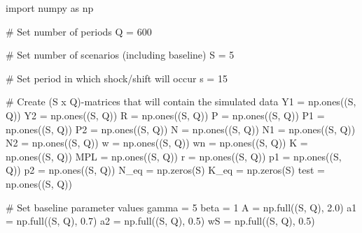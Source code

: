 \documentclass[
  letterpaper,
  DIV=11,
  numbers=noendperiod]{scrreprt}
\newenvironment{Shaded}{\begin{snugshade}}{\end{snugshade}}
\newcommand{\CommentTok}[1]{\textcolor[rgb]{0.37,0.37,0.37}{#1}}
\newcommand{\DecValTok}[1]{\textcolor[rgb]{0.68,0.00,0.00}{#1}}
\newcommand{\FloatTok}[1]{\textcolor[rgb]{0.68,0.00,0.00}{#1}}
\newcommand{\ImportTok}[1]{\textcolor[rgb]{0.00,0.46,0.62}{#1}}
\newcommand{\NormalTok}[1]{\textcolor[rgb]{0.00,0.23,0.31}{#1}}
\newcommand{\OperatorTok}[1]{\textcolor[rgb]{0.37,0.37,0.37}{#1}}
\begin{document}
\begin{tcolorbox}[enhanced jigsaw, titlerule=0mm, breakable, bottomrule=.15mm, toprule=.15mm, colbacktitle=quarto-callout-note-color!10!white, rightrule=.15mm, toptitle=1mm, opacityback=0, left=2mm, coltitle=black, title=\textcolor{quarto-callout-note-color}{\faInfo}\hspace{0.5em}{Python code}, colframe=quarto-callout-note-color-frame, opacitybacktitle=0.6, leftrule=.75mm, bottomtitle=1mm, arc=.35mm, colback=white]

\begin{Shaded}
\begin{Highlighting}[]
\ImportTok{import}\NormalTok{ numpy }\ImportTok{as}\NormalTok{ np}

\CommentTok{\# Set number of periods}
\NormalTok{Q }\OperatorTok{=} \DecValTok{600}

\CommentTok{\# Set number of scenarios (including baseline)}
\NormalTok{S }\OperatorTok{=} \DecValTok{5}

\CommentTok{\# Set period in which shock/shift will occur}
\NormalTok{s }\OperatorTok{=} \DecValTok{15}

\CommentTok{\# Create (S x Q){-}matrices that will contain the simulated data}
\NormalTok{Y1 }\OperatorTok{=}\NormalTok{ np.ones((S, Q))}
\NormalTok{Y2 }\OperatorTok{=}\NormalTok{ np.ones((S, Q))}
\NormalTok{R }\OperatorTok{=}\NormalTok{ np.ones((S, Q))}
\NormalTok{P }\OperatorTok{=}\NormalTok{ np.ones((S, Q))}
\NormalTok{P1 }\OperatorTok{=}\NormalTok{ np.ones((S, Q))}
\NormalTok{P2 }\OperatorTok{=}\NormalTok{ np.ones((S, Q))}
\NormalTok{N }\OperatorTok{=}\NormalTok{ np.ones((S, Q))}
\NormalTok{N1 }\OperatorTok{=}\NormalTok{ np.ones((S, Q))}
\NormalTok{N2 }\OperatorTok{=}\NormalTok{ np.ones((S, Q))}
\NormalTok{w }\OperatorTok{=}\NormalTok{ np.ones((S, Q))}
\NormalTok{wn }\OperatorTok{=}\NormalTok{ np.ones((S, Q))}
\NormalTok{K }\OperatorTok{=}\NormalTok{ np.ones((S, Q))}
\NormalTok{MPL }\OperatorTok{=}\NormalTok{ np.ones((S, Q))}
\NormalTok{r }\OperatorTok{=}\NormalTok{ np.ones((S, Q))}
\NormalTok{p1 }\OperatorTok{=}\NormalTok{ np.ones((S, Q))}
\NormalTok{p2 }\OperatorTok{=}\NormalTok{ np.ones((S, Q))}
\NormalTok{N\_eq }\OperatorTok{=}\NormalTok{ np.zeros(S)}
\NormalTok{K\_eq }\OperatorTok{=}\NormalTok{ np.zeros(S)}
\NormalTok{test }\OperatorTok{=}\NormalTok{ np.ones((S, Q))}

\CommentTok{\# Set baseline parameter values}
\NormalTok{gamma }\OperatorTok{=} \DecValTok{5}
\NormalTok{beta }\OperatorTok{=} \DecValTok{1}
\NormalTok{A }\OperatorTok{=}\NormalTok{ np.full((S, Q), }\FloatTok{2.0}\NormalTok{)}
\NormalTok{a1 }\OperatorTok{=}\NormalTok{ np.full((S, Q), }\FloatTok{0.7}\NormalTok{)}
\NormalTok{a2 }\OperatorTok{=}\NormalTok{ np.full((S, Q), }\FloatTok{0.5}\NormalTok{)}
\NormalTok{wS }\OperatorTok{=}\NormalTok{ np.full((S, Q), }\FloatTok{0.5}\NormalTok{)}


\end{Highlighting}
\end{Shaded}
\end{tcolorbox}
\end{document}
